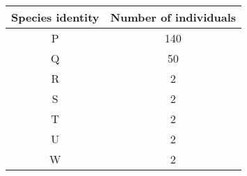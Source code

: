 \begin{center}
\begin{tabular}{|c|c|}
\hline
Species identity & Number of individuals \\
\hline
P & 140 \\
Q & 50 \\
R & 2 \\
S & 2 \\
T & 2 \\
U & 2 \\
W & 2 \\
\hline
\end{tabular}
\end{center}